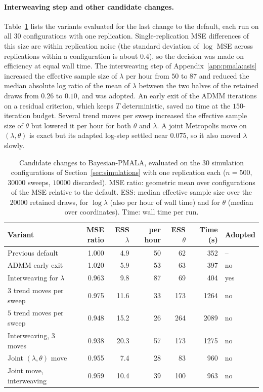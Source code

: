 \paragraph{Interweaving step and other candidate changes.} Table~\ref{tab:pmala_variants} lists the variants evaluated for the last change to the default, each run on all $30$ configurations with one replication. Single-replication MSE differences of this size are within replication noise (the standard deviation of $\log$ MSE across replications within a configuration is about $0.4$), so the decision was made on efficiency at equal wall time. The interweaving step of Appendix~\ref{app:pmala:asis} increased the effective sample size of $\lambda$ per hour from $50$ to $87$ and reduced the median absolute log ratio of the mean of $\lambda$ between the two halves of the retained draws from $0.26$ to $0.10$, and was adopted. An early exit of the ADMM iterations on a residual criterion, which keeps $T$ deterministic, saved no time at the $150$-iteration budget. Several trend moves per sweep increased the effective sample size of $\theta$ but lowered it per hour for both $\theta$ and $\lambda$. A joint Metropolis move on $(\lambda, \theta)$ is exact but its adapted log-step settled near $0.075$, so it also moved $\lambda$ slowly.

\begin{table}[!htbp]
\centering
\small
\caption{Candidate changes to Bayesian-PMALA, evaluated on the $30$ simulation configurations of Section~\ref{sec:simulations} with one replication each ($n = 500$, $30000$ sweeps, $10000$ discarded). MSE ratio: geometric mean over configurations of the MSE relative to the default. ESS: median effective sample size over the $20000$ retained draws, for $\log\lambda$ (also per hour of wall time) and for $\theta$ (median over coordinates). Time: wall time per run.}
\label{tab:pmala_variants}
\setlength{\tabcolsep}{4pt}
\begin{tabular}{lrrrrrl}
\toprule
Variant & MSE ratio & ESS $\lambda$ & per hour & ESS $\theta$ & Time (s) & Adopted \\
\midrule
Previous default & 1.000 & 4.9 & 50 & 62 & 352 & -- \\
ADMM early exit & 1.020 & 5.9 & 53 & 63 & 397 & no \\
Interweaving for $\lambda$ & 0.963 & 9.8 & 87 & 69 & 404 & yes \\
$3$ trend moves per sweep & 0.975 & 11.6 & 33 & 173 & 1264 & no \\
$5$ trend moves per sweep & 0.948 & 15.2 & 26 & 264 & 2089 & no \\
Interweaving, $3$ moves & 0.938 & 20.3 & 57 & 173 & 1275 & no \\
Joint $(\lambda,\theta)$ move & 0.955 & 7.4 & 28 & 83 & 960 & no \\
Joint move, interweaving & 0.959 & 10.4 & 39 & 100 & 963 & no \\
\bottomrule
\end{tabular}
\end{table}

